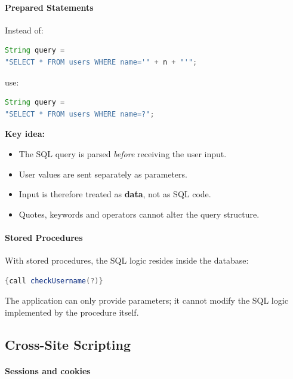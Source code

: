 \paragraph{Prepared Statements}

Instead of:

\begin{lstlisting}[language=Java]
String query =
"SELECT * FROM users WHERE name='" + n + "'";
\end{lstlisting}

use:

\begin{lstlisting}[language=Java]
String query =
"SELECT * FROM users WHERE name=?";
\end{lstlisting}

\vspace{0.3em}

\textbf{Key idea:}

\begin{itemize}
    \item The SQL query is parsed \emph{before} receiving the user input.
    \item User values are sent separately as parameters.
    \item Input is therefore treated as \textbf{data}, not as SQL code.
    \item Quotes, keywords and operators cannot alter the query structure.
\end{itemize}

\paragraph{Stored Procedures}

With stored procedures, the SQL logic resides inside the database:

\begin{lstlisting}[language=Java]
{call checkUsername(?)}
\end{lstlisting}

\vspace{0.3em}

The application can only provide parameters; it cannot modify the SQL logic implemented by the procedure itself.


\subsection{Cross-Site Scripting}

\paragraph{Sessions and cookies}

